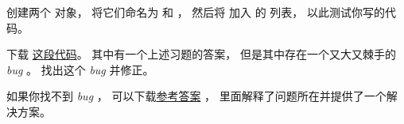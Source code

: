 \begin{exercise}


创建两个 {\em {}} 对象， 将它们命名为 {\em {}} 和 {\em {}} ， 然后将 {\em {}} 加入 {\em {}} 的 {\em {}} 列表， 以此测试你写的代码。

下载 \href{http://thinkpython2.com/code/BadKangaroo.py}{这段代码}。
其中有一个上述习题的答案， 但是其中存在一个又大又棘手的 {\em bug} 。
找出这个 {\em bug} 并修正。

如果你找不到 {\em bug} ， 可以下载\href{http://thinkpython2.com/code/GoodKangaroo.py}{参考答案} ， 里面解释了问题所在并提供了一个解决方案。


\end{exercise}

